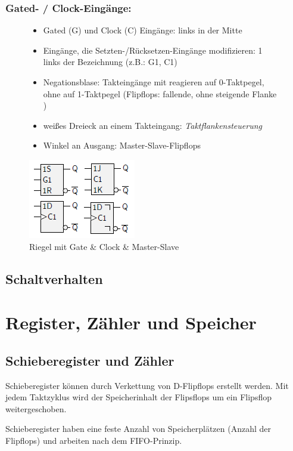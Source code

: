 \documentclass[12pt]{report}
\begin{document}
\subsubsection{Gated- / Clock-Eingänge:}
\begin{figure}[H]
  \begin{minipage}[t]{0.45\textwidth}
    \begin{itemize}
      \item Gated (G) und Clock (C) Eingänge: links in der Mitte
      \item Eingänge, die Setzten-/Rücksetzen-Eingänge modifizieren: 1 links der Bezeichnung (z.B.: G1, C1)
      \item Negationsblase: Takteingänge mit reagieren auf 0-Taktpegel, ohne auf 1-Taktpegel (Flipflops: fallende, ohne steigende Flanke )
      \item weißes Dreieck an einem Takteingang: \textit{Taktflankensteuerung}
      \item Winkel an Ausgang: Master-Slave-Flipflops
    \end{itemize}
  \end{minipage}
  \hfill
  \begin{minipage}[t]{0.45\textwidth}
    \caption{Riegel mit Gate \& Clock \& Master-Slave}
    \centering
    \includegraphics{schaltzeichen_gate_clock_master-slave}
  \end{minipage}
\end{figure}

\subsection{Schaltverhalten}


\section{Register, Zähler und Speicher}
\subsection{Schieberegister und Zähler}
\begin{defbox}
  Schieberegister können durch Verkettung von D-Flipflops erstellt werden.
  Mit jedem Taktzyklus wird der Speicherinhalt der Flipsflops um ein Flipsflop weitergeschoben.

  Schieberegister haben eine feste Anzahl von Speicherplätzen (Anzahl der Flipflops) und arbeiten
  nach dem FIFO-Prinzip.
\end{defbox}
\end{document}
